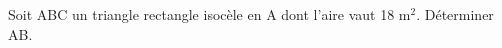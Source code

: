 \documentclass[exercice]{thedocument}%
\begin{document}
%
Soit ABC un triangle rectangle isocèle en A dont l'aire vaut 18 m$^2$.
Déterminer AB.
\end{document}
